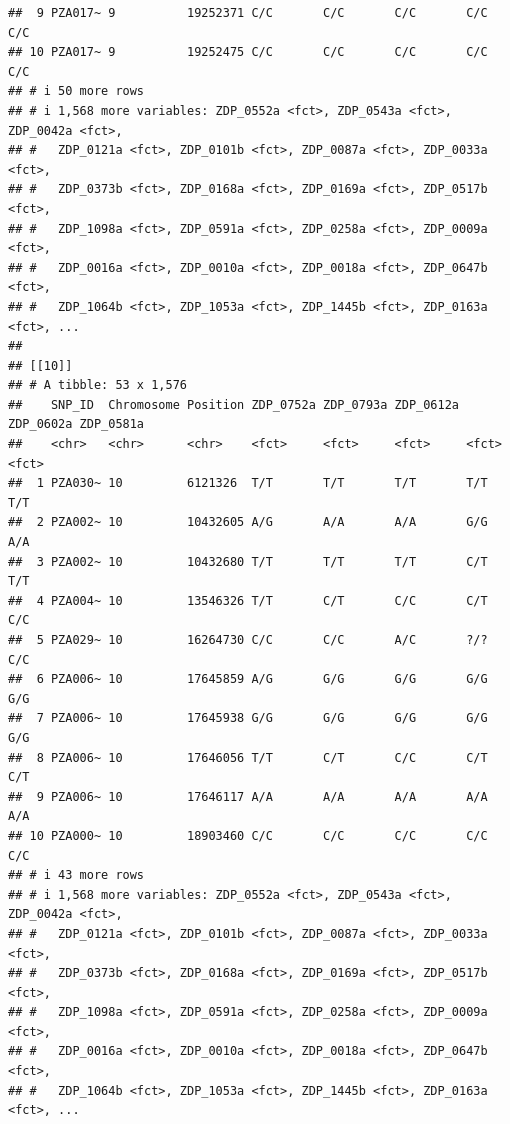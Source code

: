 \documentclass[
]{article}
\begin{document}
\begin{verbatim}
##  9 PZA017~ 9          19252371 C/C       C/C       C/C       C/C       C/C      
## 10 PZA017~ 9          19252475 C/C       C/C       C/C       C/C       C/C      
## # i 50 more rows
## # i 1,568 more variables: ZDP_0552a <fct>, ZDP_0543a <fct>, ZDP_0042a <fct>,
## #   ZDP_0121a <fct>, ZDP_0101b <fct>, ZDP_0087a <fct>, ZDP_0033a <fct>,
## #   ZDP_0373b <fct>, ZDP_0168a <fct>, ZDP_0169a <fct>, ZDP_0517b <fct>,
## #   ZDP_1098a <fct>, ZDP_0591a <fct>, ZDP_0258a <fct>, ZDP_0009a <fct>,
## #   ZDP_0016a <fct>, ZDP_0010a <fct>, ZDP_0018a <fct>, ZDP_0647b <fct>,
## #   ZDP_1064b <fct>, ZDP_1053a <fct>, ZDP_1445b <fct>, ZDP_0163a <fct>, ...
## 
## [[10]]
## # A tibble: 53 x 1,576
##    SNP_ID  Chromosome Position ZDP_0752a ZDP_0793a ZDP_0612a ZDP_0602a ZDP_0581a
##    <chr>   <chr>      <chr>    <fct>     <fct>     <fct>     <fct>     <fct>    
##  1 PZA030~ 10         6121326  T/T       T/T       T/T       T/T       T/T      
##  2 PZA002~ 10         10432605 A/G       A/A       A/A       G/G       A/A      
##  3 PZA002~ 10         10432680 T/T       T/T       T/T       C/T       T/T      
##  4 PZA004~ 10         13546326 T/T       C/T       C/C       C/T       C/C      
##  5 PZA029~ 10         16264730 C/C       C/C       A/C       ?/?       C/C      
##  6 PZA006~ 10         17645859 A/G       G/G       G/G       G/G       G/G      
##  7 PZA006~ 10         17645938 G/G       G/G       G/G       G/G       G/G      
##  8 PZA006~ 10         17646056 T/T       C/T       C/C       C/T       C/T      
##  9 PZA006~ 10         17646117 A/A       A/A       A/A       A/A       A/A      
## 10 PZA000~ 10         18903460 C/C       C/C       C/C       C/C       C/C      
## # i 43 more rows
## # i 1,568 more variables: ZDP_0552a <fct>, ZDP_0543a <fct>, ZDP_0042a <fct>,
## #   ZDP_0121a <fct>, ZDP_0101b <fct>, ZDP_0087a <fct>, ZDP_0033a <fct>,
## #   ZDP_0373b <fct>, ZDP_0168a <fct>, ZDP_0169a <fct>, ZDP_0517b <fct>,
## #   ZDP_1098a <fct>, ZDP_0591a <fct>, ZDP_0258a <fct>, ZDP_0009a <fct>,
## #   ZDP_0016a <fct>, ZDP_0010a <fct>, ZDP_0018a <fct>, ZDP_0647b <fct>,
## #   ZDP_1064b <fct>, ZDP_1053a <fct>, ZDP_1445b <fct>, ZDP_0163a <fct>, ...
\end{verbatim}
\end{document}
